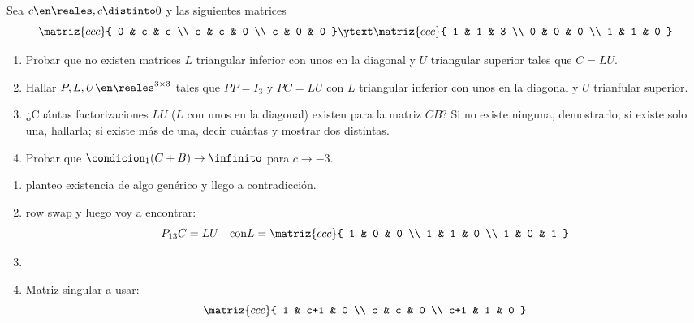 \begin{enunciado}{\ejExtra}
  Sea $c \en \reales, c \distinto 0$ y las siguientes matrices
  $$
    \matriz{ccc}{
      0 & c & c \\
      c & c & 0 \\
      c & 0 & 0
    }
    \ytext
    \matriz{ccc}{
      1 & 1 & 3 \\
      0 & 0 & 0 \\
      1 & 1 & 0
    }
  $$
  \begin{enumerate}[label=\alph*)]
    \item Probar que no existen matrices $L$ triangular inferior con unos en la diagonal y $U$
          triangular superior tales que $C = LU$.

    \item Hallar $P, L, U \en \reales^{3 \times 3}$ tales que $PP = I_3$ y $PC = LU$ con $L$ triangular inferior con unos
          en la diagonal y $U$ trianfular superior.

    \item ¿Cuántas factorizaciones $LU$ ($L$ con unos en la diagonal) existen para la matriz $CB$?
          Si no existe ninguna, demostrarlo; si existe solo una, hallarla; si existe más de una, decir cuántas y mostrar dos distintas.

    \item Probar que $\condicion_1(C+B) \to \infinito$ para $c \to -3$.
  \end{enumerate}
\end{enunciado}

\begin{enumerate}[label=\alph*)]
  \item planteo existencia de algo genérico y llego a contradicción.
  \item row swap y luego voy a encontrar:
        $$
          P_{13} C = LU
          \quad \text{con}
          L  =
          \matriz{ccc}{
            1 & 0 & 0 \\
            1 & 1 & 0 \\
            1 & 0 & 1
          }
        $$
  \item \hacer
  \item Matriz singular a usar:
      $$
          \matriz{ccc}{
            1 & c+1 & 0 \\
            c & c & 0 \\
            c+1 & 1 & 0
          }
        $$
\end{enumerate}

